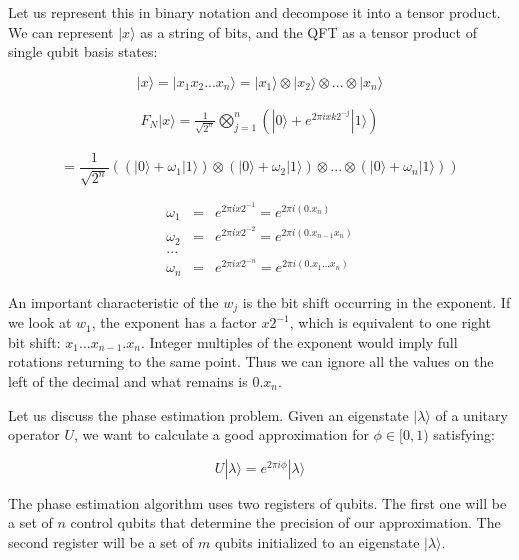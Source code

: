 \documentclass[twocolumn,showpacs,preprintnumbers,amsmath,amssymb]{revtex4}
\begin{document}
		Let us represent this in binary notation and decompose it into a tensor product. We can represent $|x\rangle$ as a string of bits, and the QFT as a tensor product of single qubit basis states:
				
		$$|x\rangle = |x_1x_2 ... x_n\rangle =  |x_1\rangle \otimes |x_2\rangle \otimes ... \otimes |x_n\rangle$$
		
		\begin{eqnarray}
		F_N |x \rangle = \frac{1}{\sqrt{2^n}} \bigotimes_{j=1}^n (|0\rangle +  e^{2\pi i x k 2^{-j}} |1\rangle)
		\end{eqnarray}
		
		$$= \frac{1}{\sqrt{2^n}} ((|0\rangle + \omega_1|1\rangle)  \otimes(|0\rangle + \omega_2|1\rangle)\otimes ... \otimes(|0\rangle + \omega_n|1\rangle))$$
	    
	     
		\begin{eqnarray*}
		\omega_1 &=& e^{2\pi i x 2^{-1}} =  e^{2\pi i (0.x_n)}\\
		\omega_2 &=& e^{2\pi i x 2^{-2}} =  e^{2\pi i (0.x_{n-1}x_n)}\\
		...\\
		\omega_n &=& e^{2\pi i x 2^{-n}} =  e^{2\pi i (0.x_1...x_n)}
		\end{eqnarray*}
	    
		
		An important characteristic of the $w_j$ is the bit shift occurring in the exponent. If we look at $w_1$, the exponent has a factor $x 2^{-1}$, which is equivalent to one right bit shift: $x_1...x_{n-1}.x_n$. Integer multiples of the exponent would imply full rotations returning to the same point. Thus we can ignore all the values on the left of the decimal and what remains is $0.x_n$. 
		
		
	    
		Let us discuss the phase estimation problem. Given an eigenstate $|\lambda \rangle$ of a unitary operator $U$, we want to calculate a good approximation  for $\phi \in [0,1)$ satisfying:
		
		\begin{equation}
		 U |\lambda \rangle = e^{2\pi i \phi} |\lambda \rangle
	    \end{equation}
	    
	    The phase estimation algorithm uses two registers of qubits. The first one will be a set of $n$ control qubits that determine the precision of our approximation. The second register will be a set of $m$ qubits initialized to an eigenstate $|\lambda\rangle$.
	    
\end{document}
